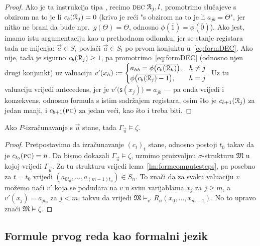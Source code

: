 \begin{proof}
Ako je ta instrukcija tipa \dec, recimo $\textsc{dec}\;\mathcal R_{j},l$, promotrimo slučajeve s obzirom na to je li $c_b(\mathcal R_{j})=0$ (krivo je reći "s obzirom na to je li $a_{jb}=\Theta$", jer nitko ne brani da bude npr.\ $g(\Theta)=\Theta$, odnosno $\phi(\overline1)=\phi(\overline0)$). Ako jest, imamo istu argumentaciju kao u prethodnom odlomku, jer se stanje registara tada ne mijenja: $\vec a\in S_i$ povlači $\vec a\in S_l$ po prvom konjuktu u~\eqref{eq:formDEC}. Ako nije, tada je sigurno $c_b(\mathcal R_{j})\ge1$, pa promotrimo~\eqref{eq:formDEC} (odnosno njen drugi konjunkt) uz valuaciju
$v'(x_h):=\begin{cases}
a_{hb}=\phi\bigl(\overline{c_b(\mathcal R_{h})}\bigr),&h\ne j\\
\phi\bigl(\overline{c_b(\mathcal R_{j})-1}\bigr),&h=j
\end{cases}$.
Uz tu valuaciju vrijedi antecedens, jer je $v'\bigl(\mathsf s(x_j)\bigr)=a_{jb}$ --- pa onda vrijedi i konzekvens, odnosno formula s istim sadržajem registara, osim što je $c_{b+1}(\mathcal R_{j})$ za jedan manji, i $c_{b+1}(\textsc{pc})$ za jedan veći, kao što i treba biti.
\end{proof}

\begin{propozicija}[{name=[zaustavljanje povlači zaključivanje]}]\label{pp:stop>models}
Ako $P$-izračunavanje s $\vec u$ stane, tada $\Gamma_{\vec u}\models\zeta$.
\end{propozicija}
\begin{proof}
Pretpostavimo da izračunavanje $(c_t)_t$ stane, odnosno postoji $t_0$ takav da je $c_{t_0}(\textsc{pc})=n$. Da bismo dokazali $\Gamma_{\vec u}\models\zeta$, uzmimo proizvoljnu $\sigma$-strukturu $\mathfrak M$ u kojoj vrijedi $\Gamma_{\vec u}$. Za tu strukturu vrijedi lema~\ref{lm:formcomputesteps}, pa posebno za $t=t_0$ vrijedi $(a_{0t_0},\dotsc,a_{(m-1)t_0})\in S_n$. To znači da za svaku valuaciju $v$ možemo naći $v'$ koja se podudara na $v$ u svim varijablama $x_j$ za $j\ge m$, a $v'(x_j)=a_{jt_0}$ za $j<m$, takvu da vrijedi $\mathfrak M\models_{v'}R_n(x_0,\dotsc,x_{m-1})$. No to upravo znači $\mathfrak M\models\zeta$.
\end{proof}


\subsection{Formule prvog reda kao formalni jezik}

